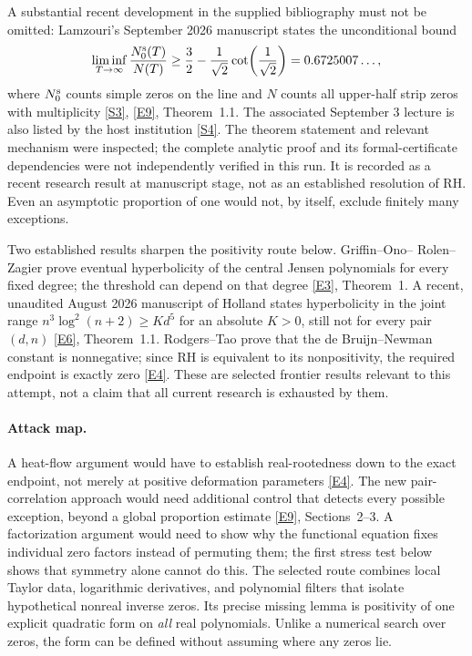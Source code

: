 \documentclass[11pt]{article}
\newcommand{\sref}[2]{\hyperlink{source:#1:#2}{[S#2]}}
\newcommand{\eref}[2]{\hyperlink{extra:#1:#2}{[E#2]}}
\begin{document}
A substantial recent development in the supplied bibliography must not be
omitted: Lamzouri's September 2026 manuscript states the unconditional bound
\[
 \liminf_{T\to\infty}\frac{N_0^{\rm s}(T)}{N(T)}
 \ge \frac32-\frac1{\sqrt2}\cot\!\left(\frac1{\sqrt2}\right)
 =0.6725007\ldots,
\]
where $N_0^{\rm s}$ counts simple zeros on the line and $N$ counts all upper-half
strip zeros with multiplicity \sref{statement}{3}, \eref{statement}{9}, Theorem~1.1.
The associated September 3 lecture is also listed by the host institution
\sref{statement}{4}. The theorem statement and relevant mechanism were inspected;
the complete analytic proof and its formal-certificate dependencies were not
independently verified in this run. It is recorded as a recent research result
at manuscript stage, not as an established resolution of RH. Even an
asymptotic proportion of one would not, by itself, exclude finitely many
exceptions.

Two established results sharpen the positivity route below. Griffin--Ono--
Rolen--Zagier prove eventual hyperbolicity of the central Jensen polynomials
for every fixed degree; the threshold can depend on that degree
\eref{statement}{3}, Theorem~1. A recent, unaudited August 2026 manuscript of Holland
states hyperbolicity in the joint range $n^3\log^2(n+2)\ge Kd^5$ for an absolute
$K>0$, still not for every pair $(d,n)$ \eref{statement}{6}, Theorem~1.1.
Rodgers--Tao prove that the de Bruijn--Newman constant is nonnegative; since
RH is equivalent to its nonpositivity, the required endpoint is exactly zero
\eref{statement}{4}. These are selected frontier results relevant to this attempt,
not a claim that all current research is exhausted by them.

\paragraph{Attack map.}
A heat-flow argument would have to establish real-rootedness down to the exact
endpoint, not merely at positive deformation parameters \eref{statement}{4}.
The new pair-correlation approach would need additional control that detects
every possible exception, beyond a global proportion estimate
\eref{statement}{9}, Sections~2--3. A factorization argument would need to show why the
functional equation fixes individual zero factors instead of permuting them;
the first stress test below shows that symmetry alone cannot do this.
The selected route combines local Taylor data, logarithmic derivatives,
and polynomial filters that isolate hypothetical nonreal inverse zeros.
Its precise missing lemma is positivity of one explicit quadratic form on
\emph{all} real polynomials. Unlike a numerical search over zeros, the form
can be defined without assuming where any zeros lie.
\end{document}
